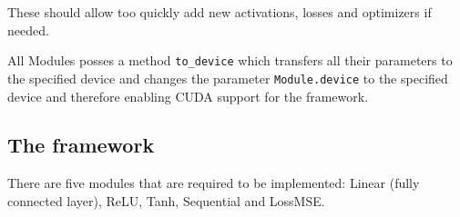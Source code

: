 \documentclass[11pt,english]{article}
\begin{document}
	These should allow too quickly add new activations, losses and optimizers if needed.
	
	All Modules posses a method \lstinline|to_device| which transfers all their parameters to the specified device and changes the parameter \lstinline|Module.device| to the specified device and therefore enabling CUDA support for the framework.
	\subsection{The framework}
	
	There are five modules that are required to be implemented: Linear (fully connected layer), ReLU, Tanh, Sequential and LossMSE.
	
	
	\printbibliography
\end{document}
